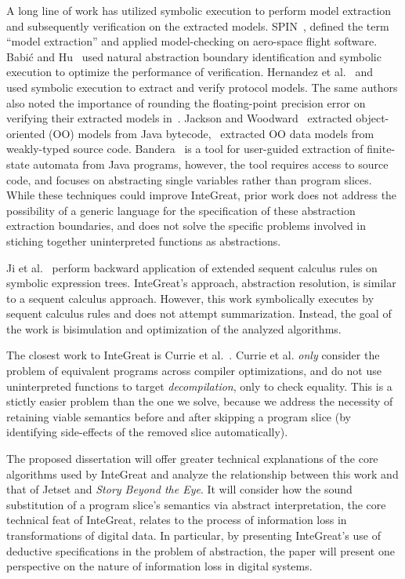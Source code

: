 A long line of work has utilized symbolic execution to perform model extraction and subsequently verification on the extracted models.
SPIN~\cite{spin}, defined the term ``model extraction'' and applied model-checking on aero-space flight software.
Babi\'c and Hu~\cite{babic2007structural} used natural abstraction boundary identification and symbolic execution to optimize the performance of verification.
Hernandez et al.~\cite{firmusb} and~\cite{cryto-symex} used symbolic execution to extract and verify protocol models.
The same authors also noted the importance of rounding the floating-point precision error on verifying their extracted models in~\cite{precision}.
Jackson and Woodward~\cite{lightweight-oo} extracted object-oriented (OO) models from Java bytecode,~\cite{oo-model} extracted OO data models from weakly-typed source code. 
Bandera~\cite{tool-supported-program-abstraction} is a tool for user-guided extraction of finite-state automata from Java programs, however, the tool requires access to source code, and focuses on abstracting single variables rather than program slices.
While these techniques could improve InteGreat, prior work does not address the possibility of a generic language for the specification of these abstraction extraction boundaries, and does not solve the specific problems involved in stiching together uninterpreted functions as abstractions.

Ji et al.~\cite{transformation} perform backward application of extended sequent calculus rules on symbolic expression trees.
InteGreat's approach, abstraction resolution, is similar to a sequent calculus approach.
However, this work symbolically executes by sequent calculus rules and does not attempt summarization. 
Instead, the goal of the work is bisimulation and optimization of the analyzed algorithms.

The closest work to InteGreat is Currie et al.~\cite{currie2006embedded}. 
Currie et al. \emph{only} consider the problem of equivalent programs across compiler optimizations, and do not use uninterpreted functions to target \emph{decompilation}, only to check equality.
This is a stictly easier problem than the one we solve, because we address the necessity of retaining viable semantics before and after skipping a program slice (by identifying side-effects of the removed slice automatically).

The proposed dissertation will offer greater technical explanations of the core algorithms used by InteGreat and analyze the relationship between this work and that of Jetset and \emph{Story Beyond the Eye}.
It will consider how the sound substitution of a program slice's semantics via abstract interpretation, the core technical feat of InteGreat, relates to the process of information loss in transformations of digital data.
In particular, by presenting InteGreat's use of deductive specifications in the problem of abstraction, the paper will present one perspective on the nature of information loss in digital systems.

